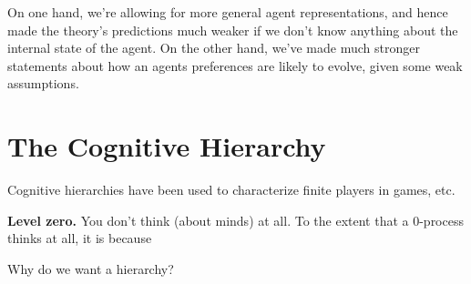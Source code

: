 \documentclass{article}
\begin{document}
	On one hand, we're allowing for more general agent representations, and hence made the theory's predictions much weaker if we don't know anything about the internal state of the agent. On the other hand, we've made much stronger statements about how an agents preferences are likely to evolve, given some weak assumptions.  
	
	
	
	\section{The Cognitive Hierarchy}
	
	
	Cognitive hierarchies have been used to characterize finite players in games, etc. 
	
	
	\textbf{Level zero.} You don't think (about minds) at all. To the extent that a 0-process thinks at all, it is because
	
	
	
	Why do we want a hierarchy? 
\end{document}
